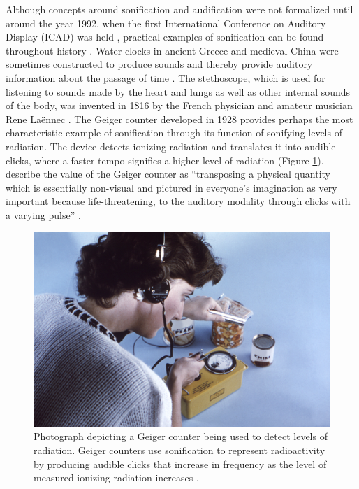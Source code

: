 \documentclass[10pt,a4paper,onecolumn]{article}
\begin{document}
Although concepts around sonification and audification were not formalized until around the year 1992, when the first International Conference on Auditory Display (ICAD) was held \autocite{dubusSonificationPhysicalQuantities2011}, practical examples of sonification can be found throughout history \autocite{dubusInteractiveSonificationMotion2013}. Water clocks in ancient Greece and medieval China were sometimes constructed to produce sounds and thereby provide auditory information about the passage of time \autocite{dubusSonificationPhysicalQuantities2011}. The stethoscope, which is used for listening to sounds made by the heart and lungs as well as other internal sounds of the body, was invented in 1816 by the French physician and amateur musician Rene Laënnec \autocite{roguinReneTheophileHyacinthe2006}. The Geiger counter developed in 1928 provides perhaps the most characteristic example of sonification through its function of sonifying levels of radiation. The device detects ionizing radiation and translates it into audible clicks, where a faster tempo signifies a higher level of radiation (Figure \ref{fig:geiger-counter}). \textcite{dubusSonificationPhysicalQuantities2011} describe the value of the Geiger counter as ``transposing a physical quantity which is essentially non-visual and pictured in everyone's imagination as very important because life-threatening, to the auditory modality through clicks with a varying pulse'' \autocite[p.~1]{dubusSonificationPhysicalQuantities2011}.



\begin{figure}[h]

{\centering \includegraphics[width=1\linewidth]{figures/Geiger_counter_usage} 

}

\caption{Photograph depicting a Geiger counter being used to detect levels of radiation. Geiger counters use sonification to represent radioactivity by producing audible clicks that increase in frequency as the level of measured ionizing radiation increases \autocite{dobsonDetailsPublicHealth1963}.}\label{fig:geiger-counter}
\end{figure}
\end{document}
